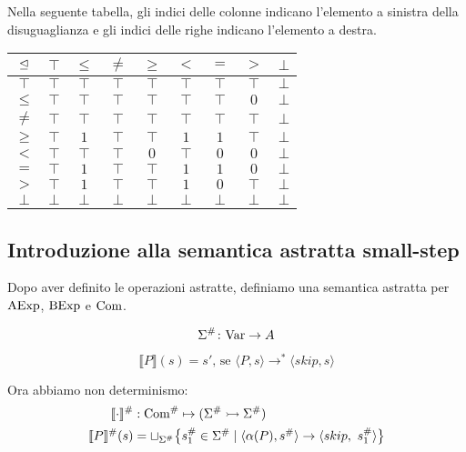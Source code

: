 \begin{definizione}
Nella seguente tabella, gli indici delle colonne indicano
l'elemento a sinistra della disuguaglianza e gli indici delle righe
indicano l'elemento a destra.
\end{definizione}

\begin{center}
	\begin{tabular}{ c | c c c c c c c c }
		$\mathrel{\trianglelefteq}$ & $\top$ & $\leq$ & $\neq$ & $\geq$ & $<$ & $=$ & $>$ & $\bot$ \\
		\hline
		$\top$ & $\top$ & $\top$ & $\top$ & $\top$ & $\top$ & $\top$ & $\top$ & $\bot$ \\
		$\leq$ & $\top$ & $\top$ & $\top$ & $\top$ & $\top$ & $\top$ & $0$ & $\bot$ \\
		$\neq$ & $\top$ & $\top$ & $\top$ & $\top$ & $\top$ & $\top$ & $\top$ & $\bot$\\
		$\geq$ & $\top$ & $1$ & $\top$ & $\top$ & $1$ & $1$ & $\top$ & $\bot$ \\
		$<$ & $\top$ & $\top$ & $\top$ & $0$ & $\top$ & $0$ & $0$ & $\bot$\\
		$=$ & $\top$ & $1$ & $\top$ & $\top$ & $1$ & $1$ & $0$ & $\bot$ \\
		$>$ & $\top$ & $1$ & $\top$ & $\top$ & $1$ & $0$ & $\top$ & $\bot$ \\
		$\bot$ & $\bot$ & $\bot$ & $\bot$ & $\bot$ & $\bot$ & $\bot$ & $\bot$ & $\bot$
	\end{tabular}
\end{center}

\subsection{Introduzione alla semantica astratta small-step}
Dopo aver definito le operazioni astratte,
definiamo una semantica astratta per $\mathrm{AExp}$, $\mathrm{BExp}$ e $\mathrm{Com}$.

\begin{definizione}
\[
	\mathord{\Sigma^\#}\colon\mathrm{Var}\to A
\]
\end{definizione}

\begin{definizione}
\[	
	\llbracket P \rrbracket (s) = s' \text{, se } \langle P, s \rangle \rightarrow^* \langle skip, s \rangle
\]
\end{definizione}

Ora abbiamo non determinismo:
\begin{align*}
	\llbracket \cdot \rrbracket^\# &: \mathrm{Com}^\# \mapsto (\Sigma^\# \rightarrowtail \Sigma^\#) \\
	\llbracket P \rrbracket^\# (s) &=  \sqcup _{\Sigma^\#} \bigl\{ s^\#_1 \in \Sigma^\# \mid \langle \alpha(P), s^\# \rangle \rightarrow \langle skip,\ s^\#_1 \rangle \bigr\}
\end{align*}

